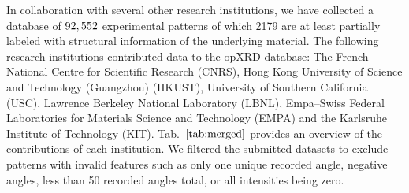 In collaboration with several other research institutions, we have collected a database of $92,552$ experimental patterns of which 2179 are at least partially labeled with structural information of the underlying material. The following research institutions contributed data to the opXRD database: The French National Centre for Scientific Research (CNRS), Hong Kong University of Science and Technology (Guangzhou) (HKUST), University of Southern California (USC), Lawrence Berkeley National Laboratory (LBNL), Empa–Swiss Federal Laboratories for Materials Science and Technology (EMPA) and the Karlsruhe Institute of Technology (KIT). Tab.~$\eqref{tab:merged}$ provides an overview of the contributions of each institution. We filtered the submitted datasets to exclude patterns with invalid features such as only one unique recorded angle, negative angles, less than 50 recorded angles total, or all intensities being zero.

\begin{table}[!htb]
\centering
\caption{\footnotesize Overview of the contributions to the opXRD database: The availability of the chemical composition, spacegroups, lattice parameters, and atomic coordinates of the underlying samples are indicated by the columns ``Comp.'', ``Spg.'', ``Lattice'' and ``Atom coords.'' respectively.}
\label{tab:merged}
\end{table}

